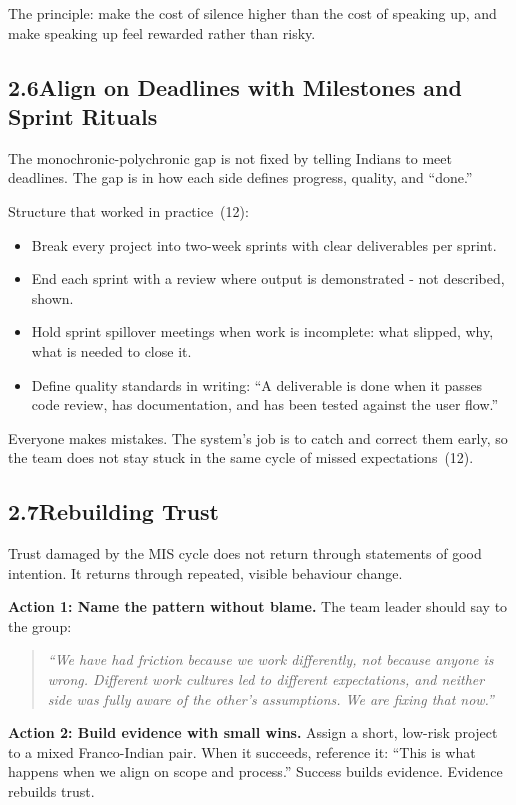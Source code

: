 \documentclass[12pt, a4paper]{article}
\begin{document}
The principle: make the cost of silence higher than the cost of speaking up, and make speaking up feel rewarded rather than risky.

\subsection*{2.6\quad Align on Deadlines with Milestones and Sprint Rituals}

The monochronic-polychronic gap is not fixed by telling Indians to meet deadlines. The gap is in how each side defines progress, quality, and ``done.''

Structure that worked in practice~(12):
\begin{itemize}[noitemsep]
    \item Break every project into two-week sprints with clear deliverables per sprint.
    \item End each sprint with a review where output is demonstrated - not described, shown.
    \item Hold sprint spillover meetings when work is incomplete: what slipped, why, what is needed to close it.
    \item Define quality standards in writing: ``A deliverable is done when it passes code review, has documentation, and has been tested against the user flow.''
\end{itemize}

Everyone makes mistakes. The system's job is to catch and correct them early, so the team does not stay stuck in the same cycle of missed expectations~(12).

\subsection*{2.7\quad Rebuilding Trust}

Trust damaged by the MIS cycle does not return through statements of good intention. It returns through repeated, visible behaviour change.

\textbf{Action 1: Name the pattern without blame.} The team leader should say to the group:
\begin{quote}
\textit{``We have had friction because we work differently, not because anyone is wrong. Different work cultures led to different expectations, and neither side was fully aware of the other's assumptions. We are fixing that now.''}
\end{quote}

\textbf{Action 2: Build evidence with small wins.} Assign a short, low-risk project to a mixed Franco-Indian pair. When it succeeds, reference it: ``This is what happens when we align on scope and process.'' Success builds evidence. Evidence rebuilds trust.
\end{document}
